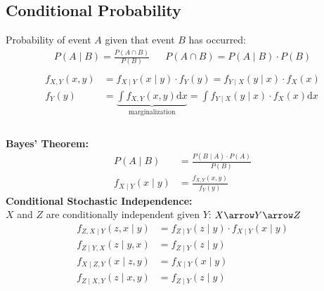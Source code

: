 \begin{mdframed}[style=eqbox]
  \subsection{Conditional Probability}
  Probability of event $A$ given that event $B$ has occurred:
  \begin{align*}
    P(A \mid B) = \frac{P(A \cap B)}{P(B)} && P(A \cap B) = P(A \mid B) \cdot P(B)\\
  \end{align*}
  \vspace*{-32pt}
  \begin{align*}
    f_{X,Y}(x,y) &= f_{X \mid Y}(x \mid y) \cdot f_Y(y) = f_{Y \mid X}(y \mid x) \cdot f_X(x)\\
    f_{Y}(y) &= \underbrace{\int f_{X,Y}(x,y) \text{d}x}_{\text{marginalization}} = \int f_{Y \mid X}(y \mid x) \cdot f_X(x) \text{d}x\\
  \end{align*}\vspace*{-24pt}\\
  \textbf{Bayes' Theorem:}
  \vspace*{-4pt}
  \begin{align*}
    P(A \mid B) &= \frac{P(B \mid A) \cdot P(A)}{P(B)}\\
    f_{X \mid Y}(x \mid y) &= \frac{f_{X,Y}(x,y)}{f_Y(y)}
  \end{align*}
  \textbf{Conditional Stochastic Independence:}\\
  $X$ and $Z$ are conditionally independent given $Y$: $X \arrow Y \arrow Z$
  \vspace*{-4pt}
  \begin{align*}
    f_{Z,X \mid Y}(z,x \mid y) &= f_{Z \mid Y}(z \mid y) \cdot f_{X \mid Y}(x \mid y)\\
    f_{Z \mid Y, X}(z \mid y, x) &= f_{Z \mid Y}(z \mid y)\\
    f_{X \mid Z,Y}(x \mid z, y) &= f_{X \mid Y}(x \mid y)\\
    f_{Z \mid X,Y}(z \mid x, y) &= f_{Z \mid Y}(z \mid y)
  \end{align*}
\end{mdframed}

